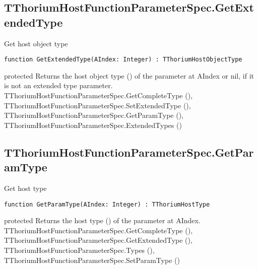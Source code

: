 \subsection{TThoriumHostFunctionParameterSpec.GetExtendedType}
\label{thoriumcorepkg:thorium:tthoriumhostfunctionparameterspec:getextendedtype}
\begin{FPCList}
\Synopsis
Get host object type\Declaration 

\begin{verbatim}
function GetExtendedType(AIndex: Integer) : TThoriumHostObjectType
\end{verbatim}
\Visibility
protected
\Description
Returns the host object type (\pageref{thoriumcorepkg:thorium:tthoriumhostobjecttype}) of the parameter at AIndex or nil, if it is not an extended type parameter.\SeeAlso
TThoriumHostFunctionParameterSpec.GetCompleteType (\pageref{thoriumcorepkg:thorium:tthoriumhostfunctionparameterspec:getcompletetype}),
TThoriumHostFunctionParameterSpec.SetExtendedType (\pageref{thoriumcorepkg:thorium:tthoriumhostfunctionparameterspec:setextendedtype}),
TThoriumHostFunctionParameterSpec.GetParamType (\pageref{thoriumcorepkg:thorium:tthoriumhostfunctionparameterspec:getparamtype}),
TThoriumHostFunctionParameterSpec.ExtendedTypes (\pageref{thoriumcorepkg:thorium:tthoriumhostfunctionparameterspec:extendedtypes})\end{FPCList}
\subsection{TThoriumHostFunctionParameterSpec.GetParamType}
\label{thoriumcorepkg:thorium:tthoriumhostfunctionparameterspec:getparamtype}
\begin{FPCList}
\Synopsis
Get host type\Declaration 

\begin{verbatim}
function GetParamType(AIndex: Integer) : TThoriumHostType
\end{verbatim}
\Visibility
protected
\Description
Returns the host type (\pageref{thoriumcorepkg:thorium}) of the parameter at AIndex. \SeeAlso
TThoriumHostFunctionParameterSpec.GetCompleteType (\pageref{thoriumcorepkg:thorium:tthoriumhostfunctionparameterspec:getcompletetype}),
TThoriumHostFunctionParameterSpec.GetExtendedType (\pageref{thoriumcorepkg:thorium:tthoriumhostfunctionparameterspec:getextendedtype}),
TThoriumHostFunctionParameterSpec.Types (\pageref{thoriumcorepkg:thorium:tthoriumhostfunctionparameterspec:types}),
TThoriumHostFunctionParameterSpec.SetParamType (\pageref{thoriumcorepkg:thorium:tthoriumhostfunctionparameterspec:setparamtype})\end{FPCList}
